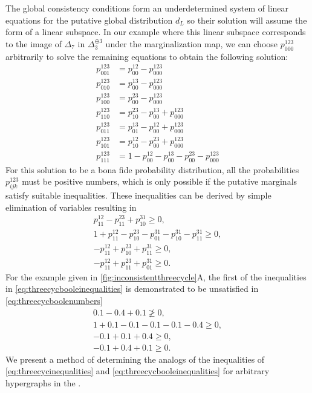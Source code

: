 The global consistency conditions form an underdetermined system of linear equations for the putative global distribution $d_{L}$ so their solution will assume the form of a linear subspace.  In our example where this linear subspace corresponds to the image of $\Delta_7$ in $\Delta_3^{\oplus 3}$ under the marginalization map, we can choose $p^{123}_{000}$ arbitrarily to solve the remaining equations to obtain the following solution:
\begin{align*}
p^{123}_{001} &= p^{12}_{00} - p^{123}_{000} \\
p^{123}_{010} &= p^{13}_{00} - p^{123}_{000} \\
p^{123}_{100} &= p^{23}_{00} - p^{123}_{000} \\
p^{123}_{110} &= p^{23}_{10} - p^{13}_{00} + p^{123}_{000} \\
p^{123}_{011} &= p^{13}_{01} - p^{12}_{00} + p^{123}_{000} \\
p^{123}_{101} &= p^{12}_{10} - p^{23}_{00} + p^{123}_{000} \\
p^{123}_{111} &= 1 - p^{12}_{00} - p^{13}_{00} - p^{23}_{00} - p^{123}_{000}
\end{align*}
For this solution to be a bona fide probability distribution, all the probabilities $p^{123}_{ijk}$ must be positive numbers, which is only possible if the putative marginals satisfy suitable inequalities. These inequalities can be derived by simple elimination of variables resulting in
\begin{equation}
\begin{aligned}\label{eq:threecycbooleinequalities}
p^{12}_{11} - p^{23}_{11} + p^{31}_{10} \geq 0, \\
1 + p^{12}_{11} - p^{23}_{10} - p^{31}_{01} - p^{31}_{10} - p^{31}_{11} \geq 0, \\
-p^{12}_{11} + p^{23}_{10} + p^{31}_{11} \geq 0, \\
-p^{12}_{11} + p^{23}_{11} + p^{31}_{01} \geq 0.
\end{aligned}
\end{equation}
For the example given in \ref{fig:inconsistentthreecycle}A, the first of the inequalities in \ref{eq:threecycbooleinequalities} is demonstrated to be unsatisfied in \ref{eq:threecycboolenumbers}
\begin{equation}
\begin{aligned}\label{eq:threecycboolenumbers}
0.1 - 0.4 + 0.1 \not\geq 0, \\
1 + 0.1 - 0.1 - 0.1 - 0.1 - 0.4 \geq 0, \\
-0.1 + 0.1 + 0.4 \geq 0, \\
-0.1 + 0.4 + 0.1 \geq 0.
\end{aligned}
\end{equation}
We present a method of determining the analogs of the inequalities of \ref{eq:threecycinequalities} and \ref{eq:threecycbooleinequalities} for arbitrary hypergraphs in the .

